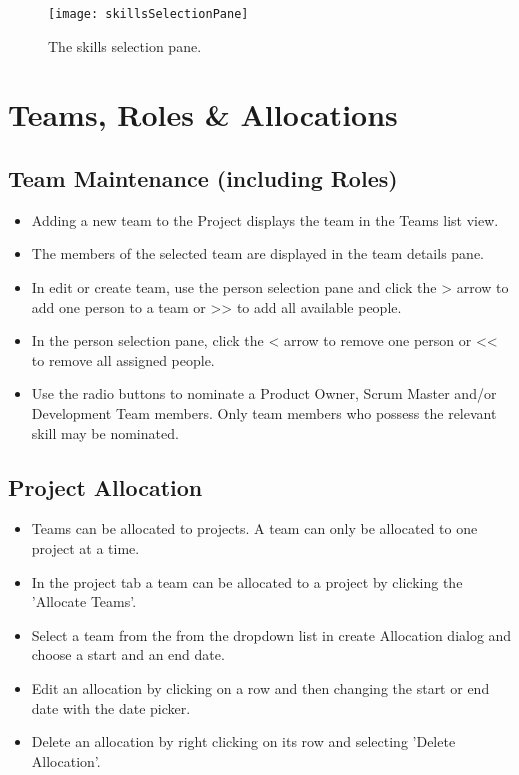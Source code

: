 \documentclass[11pt,fleqn]{book} %
\begin{document}
\begin{figure}[H]
  \centering
  \texttt{[image: skillsSelectionPane]}
  \caption{The skills selection pane.\label{skillsSelectionPane}}
\end{figure}

\section{Teams, Roles \& Allocations}
\subsection{Team Maintenance (including Roles)}
\begin{itemize}
  \item Adding a new team to the Project displays the team in the Teams list view.
  \item The members of the selected team are displayed in the team details pane.
  \item In edit or create team, use the person selection pane and click the > arrow to add one person to a team
  or >> to add all available people.
  \item In the person selection pane, click the < arrow to remove one person or << to remove all assigned people.
  \item Use the radio buttons to nominate a Product Owner, Scrum Master and/or Development Team members. Only team members who
   possess the relevant skill may be nominated.
\end{itemize}

\subsection{Project Allocation}
\begin{itemize}
  \item Teams can be allocated to projects. A team can only be allocated to one project at a time.
  \item In the project tab a team can be allocated to a project by clicking the 'Allocate Teams'.
  \item Select a team from the from the dropdown list in create Allocation dialog and choose a start and an end date.
  \item Edit an allocation by clicking on a row and then changing the start or end date with the date picker.
  \item Delete an allocation by right clicking on its row and selecting 'Delete Allocation'.
\end{itemize}
\end{document}
